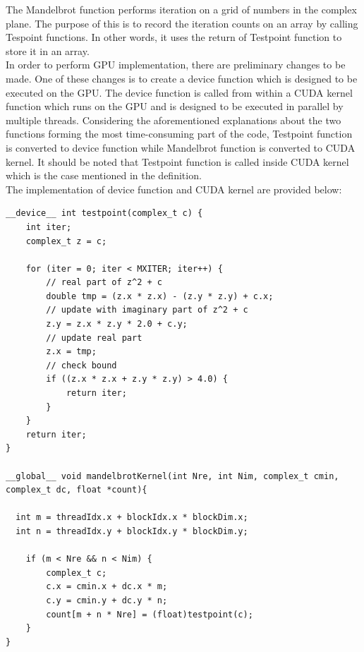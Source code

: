 \documentclass{article}
\begin{document}
The Mandelbrot function performs iteration on a grid of numbers in the complex plane. The purpose of this is to record the iteration counts on an array by calling Tespoint functions. In other words, it uses the return of Testpoint function to store it in an array. \\

In order to perform GPU implementation, there are preliminary changes to be made. One of these changes is to create a device function which is designed to be executed on the GPU. The device function is called from within a CUDA kernel function which runs on the GPU and is designed to be executed in parallel by multiple threads. Considering the aforementioned explanations about the two functions forming the most time-consuming part of the code, Testpoint function is converted to device function while Mandelbrot function is converted to CUDA kernel. It should be noted that Testpoint function is called inside CUDA kernel which is the case mentioned in the definition. \\

The implementation of device function and CUDA kernel are provided below: 

\begin{verbatim}
__device__ int testpoint(complex_t c) {
    int iter;
    complex_t z = c;

    for (iter = 0; iter < MXITER; iter++) {
        // real part of z^2 + c
        double tmp = (z.x * z.x) - (z.y * z.y) + c.x;
        // update with imaginary part of z^2 + c
        z.y = z.x * z.y * 2.0 + c.y;
        // update real part
        z.x = tmp;
        // check bound
        if ((z.x * z.x + z.y * z.y) > 4.0) {
            return iter;
        }
    }
    return iter;
}

__global__ void mandelbrotKernel(int Nre, int Nim, complex_t cmin, complex_t dc, float *count){

  int m = threadIdx.x + blockIdx.x * blockDim.x;
  int n = threadIdx.y + blockIdx.y * blockDim.y;

    if (m < Nre && n < Nim) {
        complex_t c;
        c.x = cmin.x + dc.x * m;
        c.y = cmin.y + dc.y * n;
        count[m + n * Nre] = (float)testpoint(c);
    }
}
\end{verbatim}
\end{document}
